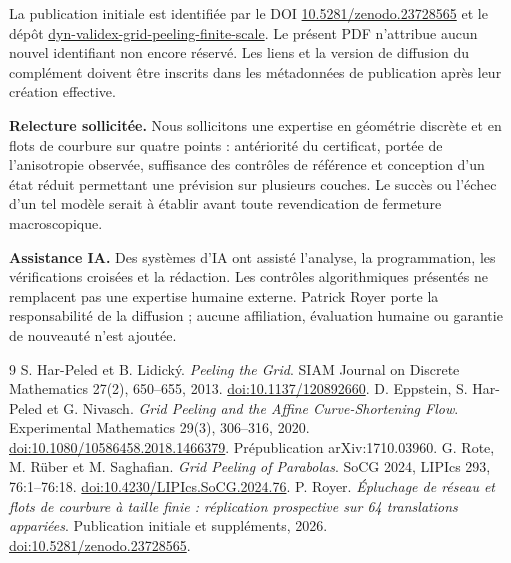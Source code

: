 \documentclass[11pt,a4paper]{article}
\begin{document}
La publication initiale est identifiée par le DOI \href{https://doi.org/10.5281/zenodo.23728565}{10.5281/zenodo.23728565} et le dépôt \href{https://github.com/royerpatrick-ops/dyn-validex-grid-peeling-finite-scale}{dyn-validex-grid-peeling-finite-scale}. Le présent PDF n'attribue aucun nouvel identifiant non encore réservé. Les liens et la version de diffusion du complément doivent être inscrits dans les métadonnées de publication après leur création effective.

\textbf{Relecture sollicitée.} Nous sollicitons une expertise en géométrie discrète et en flots de courbure sur quatre points : antériorité du certificat, portée de l'anisotropie observée, suffisance des contrôles de référence et conception d'un état réduit permettant une prévision sur plusieurs couches. Le succès ou l'échec d'un tel modèle serait à établir avant toute revendication de fermeture macroscopique.

\textbf{Assistance IA.} Des systèmes d'IA ont assisté l'analyse, la programmation, les vérifications croisées et la rédaction. Les contrôles algorithmiques présentés ne remplacent pas une expertise humaine externe. Patrick Royer porte la responsabilité de la diffusion ; aucune affiliation, évaluation humaine ou garantie de nouveauté n'est ajoutée.

\begin{thebibliography}{9}\small
{} S. Har-Peled et B. Lidický. \textit{Peeling the Grid}. SIAM Journal on Discrete Mathematics 27(2), 650--655, 2013. \href{https://doi.org/10.1137/120892660}{doi:10.1137/120892660}.
 D. Eppstein, S. Har-Peled et G. Nivasch. \textit{Grid Peeling and the Affine Curve-Shortening Flow}. Experimental Mathematics 29(3), 306--316, 2020. \href{https://doi.org/10.1080/10586458.2018.1466379}{doi:10.1080/10586458.2018.1466379}. Prépublication arXiv:1710.03960.
 G. Rote, M. Rüber et M. Saghafian. \textit{Grid Peeling of Parabolas}. SoCG 2024, LIPIcs 293, 76:1--76:18. \href{https://doi.org/10.4230/LIPIcs.SoCG.2024.76}{doi:10.4230/LIPIcs.SoCG.2024.76}.
 P. Royer. \textit{Épluchage de réseau et flots de courbure à taille finie : réplication prospective sur 64 translations appariées}. Publication initiale et suppléments, 2026. \href{https://doi.org/10.5281/zenodo.23728565}{doi:10.5281/zenodo.23728565}.
\end{thebibliography}
\end{document}
